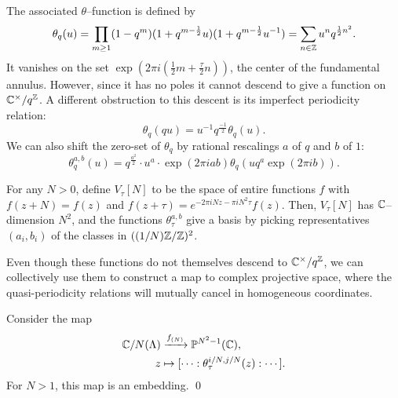 The associated $\theta$--function is defined by \[\theta_q(u) = \prod_{m \ge 1} (1 - q^m) (1 + q^{m-\frac{1}{2}}u) (1 + q^{m-\frac{1}{2}}u^{-1}) = \sum_{n \in \mathbb Z} u^n q^{\frac{1}{2} n^2}.\]  It vanishes on the set $\exp(2 \pi i (\frac{1}{2}m + \frac{\tau}{2}n))$, the center of the fundamental annulus.  However, since it has no poles it cannot descend to give a function on $\mathbb{C}^\times / q^{\mathbb Z}$.  A different obstruction to this descent is its imperfect periodicity relation: \[\theta_q(qu) = u^{-1} q^{\frac{-1}{2}} \theta_q(u).\]  We can also shift the zero-set of $\theta_q$ by rational rescalings $a$ of $q$ and $b$ of $1$: \[\theta_q^{a,b}(u) = q^{\frac{a^2}{2}} \cdot u^a \cdot \exp(2 \pi i a b) \theta_q(u q^a \exp(2 \pi i b)).\]

\begin{remark}
For any $N > 0$, define $V_\tau[N]$ to be the space of entire functions $f$ with $f(z + N) = f(z)$ and $f(z + \tau) = e^{-2 \pi i N z - \pi i N^2 \tau} f(z)$.  Then, $V_\tau[N]$ has $\mathbb{C}$--dimension $N^2$, and the functions $\theta_\tau^{a, b}$ give a basis by picking representatives $(a_i, b_i)$ of the classes in $((1/N)\mathbb Z / \mathbb Z)^2$.
\end{remark}

Even though these functions do not themselves descend to $\mathbb{C}^\times / q^{\mathbb Z}$, we can collectively use them to construct a map to complex projective space, where the quasi-periodicity relations will mutually cancel in homogeneous coordinates.
\begin{theorem}
Consider the map
\begin{align*}
\mathbb{C} / N(\Lambda) & \xrightarrow{f_{(N)}} \mathbb{P}^{N^2-1}(\mathbb{C}), \\
z & \mapsto [\cdots : \theta_\tau^{i/N, j/N}(z) : \cdots].
\end{align*}
For $N > 1$, this map is an embedding. \qed
\end{theorem}

